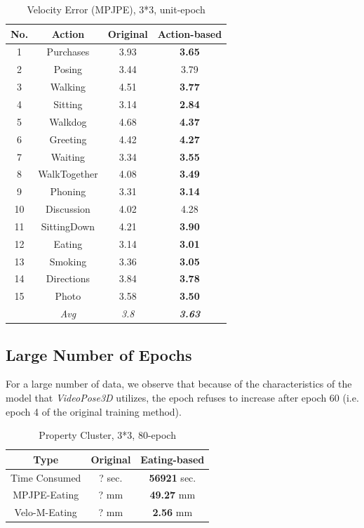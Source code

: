 \documentclass[10pt,twocolumn,letterpaper]{article}
\begin{document}
\begin{table}[H]
\caption{Velocity Error (MPJPE), 3*3, unit-epoch}

\begin{center}

\begin{tabular}{cccc}
\hline
No. & Action & Original & Action-based \\
\hline

1&Purchases& 3.93 & \textbf{3.65} \\
2&Posing& 3.44 & 3.79 \\
3&Walking& 4.51 & \textbf{3.77}\\
4&Sitting& 3.14 & \textbf{2.84} \\
5&Walkdog& 4.68 & \textbf{4.37} \\
6&Greeting& 4.42 & \textbf{4.27}\\
7&Waiting& 3.34 & \textbf{3.55} \\
8&WalkTogether& 4.08 & \textbf{3.49}\\
9&Phoning& 3.31 & \textbf{3.14} \\
10&Discussion& 4.02 & 4.28 \\
11&SittingDown& 4.21 & \textbf{3.90}\\
12&Eating& 3.14 & \textbf{3.01} \\
13&Smoking& 3.36 & \textbf{3.05}\\
14&Directions& 3.84 & \textbf{3.78}\\
15&Photo& 3.58 & \textbf{3.50}\\
&\textit{Avg}& \textit{3.8} & \textit{\textbf{3.63}}\\

\hline
\end{tabular}

\end{center}

\end{table}


\subsection{Large Number of Epochs}

For a large number of data, we observe that because of the characteristics of the model that \textit{VideoPose3D}
utilizes, the epoch refuses to increase after epoch 60 (i.e. epoch 4 of the original training method).


\begin{table}[H]
\caption{Property Cluster, 3*3, 80-epoch}
\centering
\begin{tabular}{ccc}
\hline
Type & Original  & Eating-based\\
\hline

Time Consumed&  ? sec. & \textbf{56921} sec.\\
MPJPE-Eating&  ? mm & \textbf{49.27} mm\\
Velo-M-Eating&  ? mm & \textbf{2.56} mm  \\

\hline
\end{tabular}
\end{table}
\end{document}
